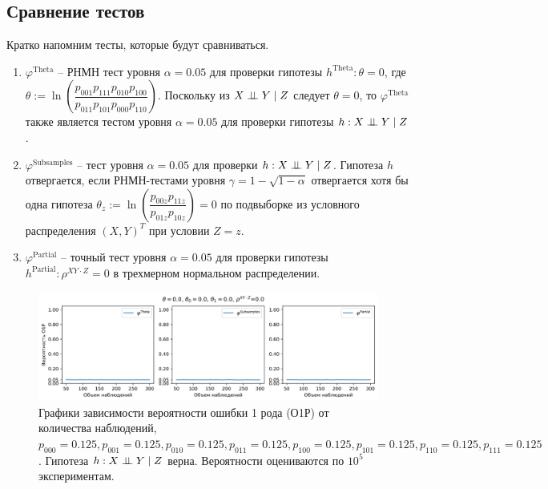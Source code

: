 \begin{centering}
    \subsection{Сравнение тестов}\label{numerical_exp}
\end{centering}
Кратко напомним тесты, которые будут сравниваться.
\begin{enumerate}
    \item $\varphi^{\text{Theta}}$ -- РНМН тест уровня 
    $\alpha=0.05$ для проверки гипотезы 
    $h^{\text{Theta}}: \theta=0$, где
     $\theta := \ln  \left(\dfrac{p_{001}p_{111}p_{010}p_{100}}{p_{011}p_{101}p_{000}p_{110}}\right)$.
    Поскольку из $X \perp\!\!\!\perp Y \mid Z$ следует $\theta=0$, 
    то $\varphi^{\text{Theta}}$ также является тестом уровня $\alpha=0.05$ для проверки
    гипотезы $h:X \perp\!\!\!\perp Y \mid Z$.
    \item $\varphi^{\text{Subsamples}}$ -- тест уровня $\alpha=0.05$
    для проверки $h: X \perp\!\!\!\perp Y \mid Z$.
    Гипотеза $h$ отвергается, если РНМН-тестами уровня 
    $\gamma=1-\sqrt{1-\alpha}$
    отвергается хотя бы 
    одна гипотеза 
    $\theta_z := \ln\left(\dfrac{p_{00z}p_{11z}}{p_{01z}p_{10z}}\right)=0$
    по подвыборке из условного распределения $(X,Y)^T$ при условии $Z=z$.
    \item $\varphi^{\text{Partial}}$ -- точный тест уровня $\alpha=0.05$
    для проверки гипотезы $h^{\text{Partial}}: \rho^{XY\cdot Z}=0$ в трехмерном нормальном распределении.
\end{enumerate}

\begin{figure}[H]
    \centering
    \includegraphics[scale=0.55]{images/graph1.png}
    \caption{Графики зависимости вероятности ошибки 1 рода (О1Р) от количества наблюдений,
     $p_{000}=0.125, p_{001}=0.125, p_{010}=0.125, p_{011}=0.125,
    p_{100}=0.125, p_{101}=0.125, p_{110}=0.125, p_{111}=0.125$. 
    Гипотеза $h: X \perp\!\!\!\perp Y \mid Z$ верна.
    Вероятности оцениваются по $10^5$ экспериментам.} \label{fig:1}
\end{figure}
    

